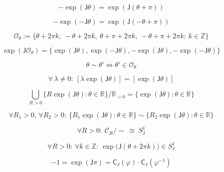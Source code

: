 \documentclass[12pt]{article}
\begin{document}
\begin{equation}
-\exp(\mathsf{J}\theta)=\exp(\mathsf{J}(\theta+\pi))
\end{equation}

\begin{equation}
-\exp(-\mathsf{J}\theta)=\exp(\mathsf{J}(-\theta+\pi))
\end{equation}

\begin{equation}
\mathcal{O}_{\theta}:=
\{\theta+2\pi k,\ -\theta+2\pi k,\ \theta+\pi+2\pi k,\ -\theta+\pi+2\pi k:\ k\in\mathbb{Z}\}
\end{equation}

\begin{equation}
\exp(\mathsf{J}\mathcal{O}_{\theta})
=
\{\exp(\mathsf{J}\theta),\exp(-\mathsf{J}\theta),-\exp(\mathsf{J}\theta),-\exp(-\mathsf{J}\theta)\}
\end{equation}

\begin{equation}
\theta\sim\theta'
\Longleftrightarrow
\theta'\in\mathcal{O}_{\theta}
\end{equation}

\begin{equation}
\forall\,\lambda\neq 0:\ [\lambda\exp(\mathsf{J}\theta)]=[\exp(\mathsf{J}\theta)]
\end{equation}

\begin{equation}
\bigcup_{R>0}\bigl\{R\exp(\mathsf{J}\theta):\theta\in\mathbb{R}\bigr\}\Big/\mathbb{R}_{>0}
=\bigl\{\exp(\mathsf{J}\theta):\theta\in\mathbb{R}\bigr\}
\end{equation}

\begin{equation}
\forall R_1>0,\,\forall R_2>0:\ \{R_1\exp(\mathsf{J}\theta):\theta\in\mathbb{R}\}\sim\{R_2\exp(\mathsf{J}\theta):\theta\in\mathbb{R}\}
\end{equation}

\begin{equation}
\forall R>0:\ \mathcal{C}_R/{\sim}\ \cong\ S^1_{\mathsf{J}}
\end{equation}

\begin{equation}
\forall R>0:\ \forall k\in\mathbb{Z}:\ \exp\bigl(\mathsf{J}(\theta+2\pi k)\bigr)\in S^1_{\mathsf{J}}
\end{equation}

\begin{equation}
-1=\exp(\mathsf{J}\pi)=\mathsf{C}_{\mathsf{J}}(\varphi)\cdot\mathsf{C}_{\mathsf{J}}(\varphi^{-1})
\end{equation}
\end{document}
